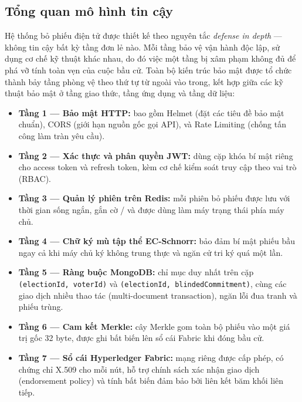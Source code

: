 \subsection{Tổng quan mô hình tin cậy}

Hệ thống bỏ phiếu điện tử được thiết kế theo nguyên tắc \textit{defense in depth} — không tin cậy bất kỳ tầng đơn lẻ nào. Mỗi tầng bảo vệ vận hành độc lập, sử dụng cơ chế kỹ thuật khác nhau, do đó việc một tầng bị xâm phạm không đủ để phá vỡ tính toàn vẹn của cuộc bầu cử. Toàn bộ kiến trúc bảo mật được tổ chức thành bảy tầng phòng vệ theo thứ tự từ ngoài vào trong, kết hợp giữa các kỹ thuật bảo mật ở tầng giao thức, tầng ứng dụng và tầng dữ liệu:

\begin{itemize}
    \item \textbf{Tầng 1 — Bảo mật HTTP:} bao gồm Helmet (đặt các tiêu đề bảo mật chuẩn), CORS (giới hạn nguồn gốc gọi API), và Rate Limiting (chống tấn công làm tràn yêu cầu).

    \item \textbf{Tầng 2 — Xác thực và phân quyền JWT:} dùng cặp khóa bí mật riêng cho access token và refresh token, kèm cơ chế kiểm soát truy cập theo vai trò (RBAC).

    \item \textbf{Tầng 3 — Quản lý phiên trên Redis:} mỗi phiên bỏ phiếu được lưu với thời gian sống ngắn, gắn cờ / và được dùng làm máy trạng thái phía máy chủ.

    \item \textbf{Tầng 4 — Chữ ký mù tập thể EC-Schnorr:} bảo đảm bí mật phiếu bầu ngay cả khi máy chủ ký không trung thực và ngăn cử tri ký quá một lần.

    \item \textbf{Tầng 5 — Ràng buộc MongoDB:} chỉ mục duy nhất trên cặp \texttt{(electionId, voterId)} và \texttt{(electionId, blindedCommitment)}, cùng các giao dịch nhiều thao tác (multi-document transaction), ngăn lỗi đua tranh và phiếu trùng.

    \item \textbf{Tầng 6 — Cam kết Merkle:} cây Merkle gom toàn bộ phiếu vào một giá trị gốc 32 byte, được ghi bất biến lên sổ cái Fabric khi đóng bầu cử.

    \item \textbf{Tầng 7 — Sổ cái Hyperledger Fabric:} mạng riêng được cấp phép, có chứng chỉ X.509 cho mỗi nút, hỗ trợ chính sách xác nhận giao dịch (endorsement policy) và tính bất biến đảm bảo bởi liên kết băm khối liên tiếp.
\end{itemize}


